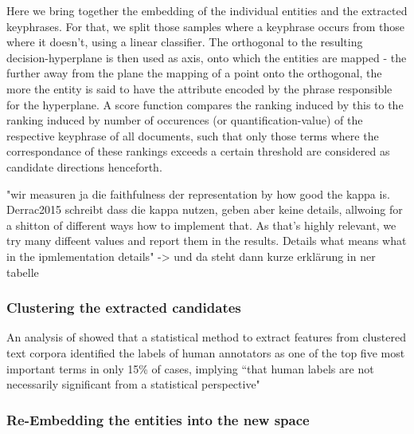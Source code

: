 

Here we bring together the embedding of the individual entities and the extracted keyphrases. For that, we split those samples where a keyphrase occurs from those where it doesn't, using a linear classifier. The orthogonal to the resulting decision-hyperplane is then used as axis, onto which the entities are mapped - the further away from the plane the mapping of a point onto the orthogonal, the more the entity is said to have the attribute encoded by the phrase responsible for the hyperplane. A score function compares the ranking induced by this to the ranking induced by number of occurences (or quantification-value) of the respective keyphrase of all documents, such that only those terms where the correspondance of these rankings exceeds a certain threshold are considered as candidate directions henceforth.

 "wir measuren ja die faithfulness der representation by how good the kappa is. Derrac2015 schreibt dass die kappa nutzen, geben aber keine details, allwoing for a shitton of different ways how to implement that. As that's highly relevant, we try many diffeent values and report them in the results. Details what means what in the ipmlementation details" -> und da steht dann kurze erklärung in ner tabelle






\subsubsection{Clustering the extracted candidates}

An analysis of \cite{Carmel2009} showed that a statistical method to extract features from clustered text corpora identified the labels of human annotators as one of the top five most important terms in only 15\% of cases, implying ``that human labels are not necessarily significant from a statistical perspective" \cite[139]{Carmel2009}


\subsubsection{Re-Embedding the entities into the new space}

